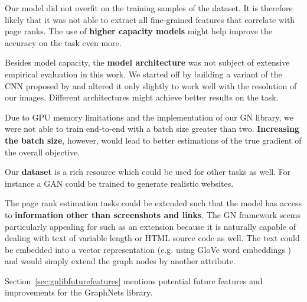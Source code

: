 Our model did not overfit on the training samples of the dataset. It is therefore likely that it was not able to extract all fine-grained features that correlate with page ranks. The use of \textbf{higher capacity models} might help improve the accuracy on the task even more.

Besides model capacity, the \textbf{model architecture} was not subject of extensive empirical evaluation in this work. We started off by building a variant of the CNN proposed by \cite{beltramelli:pix2code} and altered it only slightly to work well with the resolution of our images. Different architectures might achieve better results on the task.

Due to GPU memory limitations and the implementation of our GN library, we were not able to train end-to-end with a batch size greater than two. \textbf{Increasing the batch size}, however, would lead to better estimations of the true gradient of the overall objective.

Our \textbf{dataset} is a rich resource which could be used for other tasks as well. For instance a GAN \cite{goodfellow2014generative} could be trained to generate realistic websites.

The page rank estimation tasks could be extended such that the model has access to \textbf{information other than screenshots and links}. The GN framework seems particularly appealing for such as an extension because it is naturally capable of dealing with text of variable length or HTML source code as well. The text could be embedded into a vector representation (e.g. using GloVe word embeddings \cite{pennington2014:glove}) and would simply extend the graph nodes by another attribute.

Section~\ref{sec:gnlibfuturefeatures} mentions potential future features and improvements for the GraphNets library.
